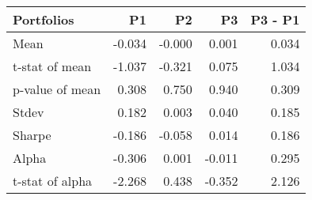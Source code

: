 \begin{tabular}{lrrrr}
\toprule
Portfolios & P1 & P2 & P3 & P3 - P1 \\
\midrule
Mean & -0.034 & -0.000 & 0.001 & 0.034 \\
t-stat of mean & -1.037 & -0.321 & 0.075 & 1.034 \\
p-value of mean & 0.308 & 0.750 & 0.940 & 0.309 \\
Stdev & 0.182 & 0.003 & 0.040 & 0.185 \\
Sharpe & -0.186 & -0.058 & 0.014 & 0.186 \\
Alpha & -0.306 & 0.001 & -0.011 & 0.295 \\
t-stat of alpha & -2.268 & 0.438 & -0.352 & 2.126 \\
\bottomrule
\end{tabular}
